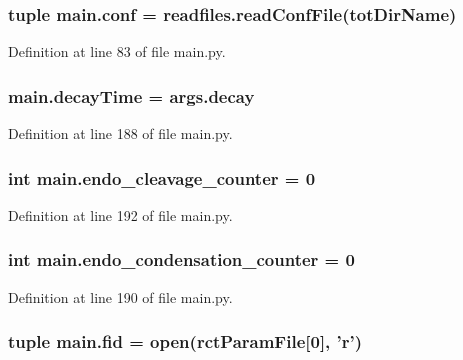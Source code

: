 \hypertarget{a00153_adc567db25548116293968a9102beab98}{
\subsubsection[{conf}]{\setlength{\rightskip}{0pt plus 5cm}tuple main.\+conf = readfiles.\+read\+Conf\+File({\bf tot\+Dir\+Name})}}\label{a00153_adc567db25548116293968a9102beab98}


Definition at line 83 of file main.\+py.

\hypertarget{a00153_a5517c07ae046c271d6291e9b3f7d139d}{
\subsubsection[{decay\+Time}]{\setlength{\rightskip}{0pt plus 5cm}main.\+decay\+Time = args.\+decay}}\label{a00153_a5517c07ae046c271d6291e9b3f7d139d}


Definition at line 188 of file main.\+py.

\hypertarget{a00153_a17b22b48a2afe0223186b4275fe5ba70}{
\subsubsection[{endo\+\_\+cleavage\+\_\+counter}]{\setlength{\rightskip}{0pt plus 5cm}int main.\+endo\+\_\+cleavage\+\_\+counter = 0}}\label{a00153_a17b22b48a2afe0223186b4275fe5ba70}


Definition at line 192 of file main.\+py.

\hypertarget{a00153_a0521d81d319c4d79433b5fb65a6da1c2}{
\subsubsection[{endo\+\_\+condensation\+\_\+counter}]{\setlength{\rightskip}{0pt plus 5cm}int main.\+endo\+\_\+condensation\+\_\+counter = 0}}\label{a00153_a0521d81d319c4d79433b5fb65a6da1c2}


Definition at line 190 of file main.\+py.

\hypertarget{a00153_a68ab0ffa4b5ff1cceff01f4abe686ad0}{
\subsubsection[{fid}]{\setlength{\rightskip}{0pt plus 5cm}tuple main.\+fid = open({\bf rct\+Param\+File}\mbox{[}0\mbox{]}, '{\bf r}')}}\label{a00153_a68ab0ffa4b5ff1cceff01f4abe686ad0}



